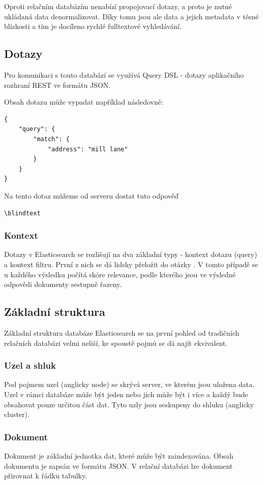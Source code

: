 Oproti relačním databázím nenabízí propojovací dotazy, a proto je nutné ukládaná data denormalizovat. Díky tomu jsou ale data a jejich metadata v těsné blízkosti a tím je docíleno rychlé fulltextové vyhledávání. %

\subsection{Dotazy}
Pro komunikaci s touto databází se využívá Query DSL - dotazy aplikačního rozhraní REST ve formátu JSON.

Obsah dotazu může vypadat například následovně:
\begin{verbatim}
{
    "query": {
        "match": {
            "address": "mill lane"
        }
    }
}
\end{verbatim}

Na tento dotaz můžeme od serveru dostat tuto odpověď
\begin{verbatim}
\blindtext
\end{verbatim} 

\subsubsection*{Kontext}
Dotazy v Elasticsearch se rozlišují na dva základní typy - kontext dotazu (query) a kontext filtru.
První z nich se dá lidsky přeložit do otázky . V tomto případě se u každého výsledku počítá skóre relevance, podle kterého jsou ve výsledné odpovědi dokumenty sestupně řazeny.


\subsection{Základní struktura}
Základní struktura databáze Elasticsearch se na první pohled od tradičních relačních databázi velmi neliší, ke spoustě pojmů se dá najít ekvivalent.

\subsubsection*{Uzel a shluk}
Pod pojmem uzel (anglicky node) se skrývá server, ve kterém jsou uložena data. Uzel v rámci databáze může být jeden nebo jich může být i více a každý bude obsahovat pouze určitou část dat. Tyto uzly jsou seskupeny do shluku (anglicky cluster).


\subsubsection*{Dokument}
Dokument je základní jednotka dat, které může být zaindexována. Obsah dokumentu je zapsán ve formátu JSON. V relační databázi lze dokument přirovnat k řádku tabulky.

